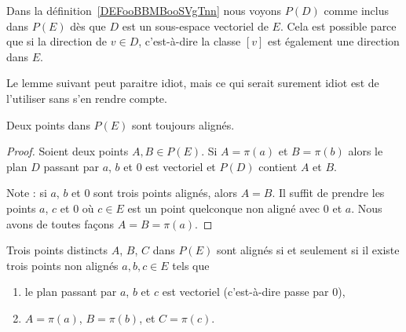 \begin{normaltext}
	Dans la définition~\ref{DEFooBBMBooSVgTnn} nous voyons \( P(D)\) comme inclus dans \( P(E)\) dès que \( D\) est un sous-espace vectoriel de \( E\). Cela est possible parce que si la direction de \( v\in D\), c'est-à-dire la classe \( [v]\) est également une direction dans \( E\).
\end{normaltext}

Le lemme suivant peut paraitre idiot, mais ce qui serait surement idiot est de l'utiliser sans s'en rendre compte.

\begin{lemma}
	Deux points dans \( P(E)\) sont toujours alignés.
\end{lemma}

\begin{proof}
	Soient deux points \( A,B\in P(E)\). Si \( A=\pi(a)\) et \( B=\pi(b)\) alors le plan \( D\) passant par \( a\), \( b\) et \( 0\) est vectoriel et \( P(D)\) contient \( A\) et \( B\).

	Note : si \( a\), \( b\) et \( 0\) sont trois points alignés, alors \( A=B\). Il suffit de prendre les points \( a\), \( c\) et \( 0\) où \( c\in E\) est un point quelconque non aligné avec \( 0\) et \( a\). Nous avons de toutes façons \( A=B=\pi(a)\).
\end{proof}

\begin{lemma}
	Trois points distincts \( A\), \( B\), \( C\) dans \( P(E)\) sont alignés si et seulement si il existe trois points non alignés \( a,b,c\in E\) tels que
	\begin{enumerate}
		\item
		      le plan passant par \( a\), \( b\) et \( c\) est vectoriel (c'est-à-dire passe par \( 0\)),
		\item
		      \( A=\pi(a)\), \( B=\pi(b)\), et \( C=\pi(c)\).
	\end{enumerate}
\end{lemma}

